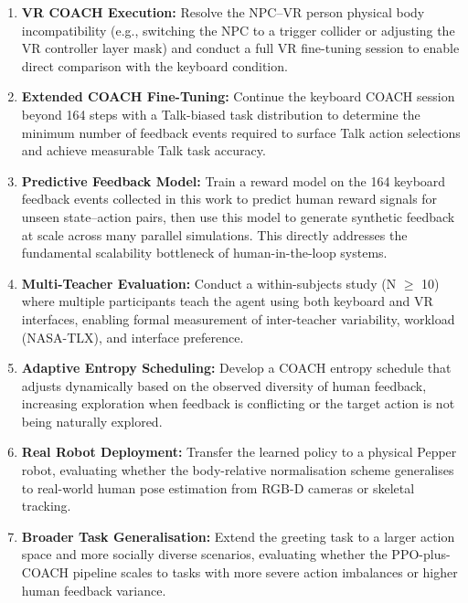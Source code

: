 \documentclass[../report.tex]{subfiles}
\begin{document}
    \begin{enumerate}
        \item \textbf{VR COACH Execution:} Resolve the NPC--VR person physical body incompatibility (e.g., switching the NPC to a trigger collider or adjusting the VR controller layer mask) and conduct a full VR fine-tuning session to enable direct comparison with the keyboard condition.

        \item \textbf{Extended COACH Fine-Tuning:} Continue the keyboard COACH session beyond 164 steps with a Talk-biased task distribution to determine the minimum number of feedback events required to surface Talk action selections and achieve measurable Talk task accuracy.

        \item \textbf{Predictive Feedback Model:} Train a reward model on the 164 keyboard feedback events collected in this work to predict human reward signals for unseen state--action pairs, then use this model to generate synthetic feedback at scale across many parallel simulations. This directly addresses the fundamental scalability bottleneck of human-in-the-loop systems.

        \item \textbf{Multi-Teacher Evaluation:} Conduct a within-subjects study (N $\geq$ 10) where multiple participants teach the agent using both keyboard and VR interfaces, enabling formal measurement of inter-teacher variability, workload (NASA-TLX), and interface preference.

        \item \textbf{Adaptive Entropy Scheduling:} Develop a COACH entropy schedule that adjusts dynamically based on the observed diversity of human feedback, increasing exploration when feedback is conflicting or the target action is not being naturally explored.

        \item \textbf{Real Robot Deployment:} Transfer the learned policy to a physical Pepper robot, evaluating whether the body-relative normalisation scheme generalises to real-world human pose estimation from RGB-D cameras or skeletal tracking.

        \item \textbf{Broader Task Generalisation:} Extend the greeting task to a larger action space and more socially diverse scenarios, evaluating whether the PPO-plus-COACH pipeline scales to tasks with more severe action imbalances or higher human feedback variance.
    \end{enumerate}
\end{document}
